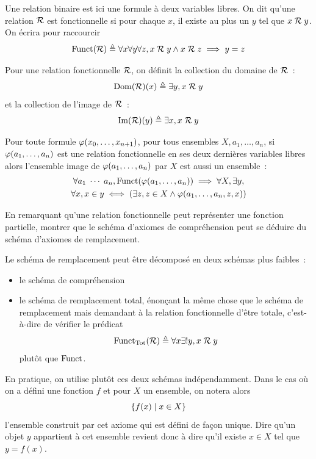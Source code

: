 \begin{definition}
  Une relation binaire est ici une formule à deux variables libres. On dit
  qu'une relation $\mathrel{\mathcal{R}}$ est fonctionnelle si pour chaque $x$, il existe
  au plus un $y$ tel que $x \mathrel{\mathcal{R}} y$. On écrira pour raccourcir
  \[\operatorname{Funct}(\mathrel{\mathcal{R}}) \triangleq \forall x\forall y\forall z,
  x \mathrel{\mathcal{R}} y\land x \mathrel{\mathcal{R}} z \implies y = z\]

  Pour une relation fonctionnelle $\mathrel{\mathcal{R}}$, on définit la collection du
  domaine de $\mathrel{\mathcal{R}}$~:
  \[\operatorname{Dom}(\mathrel{\mathcal{R}})(x)\triangleq \exists y, x \mathrel{\mathcal{R}} y\]
  et la collection de l'image de $\mathrel{\mathcal{R}}$~:
  \[\operatorname{Im}(\mathrel{\mathcal{R}})(y)\triangleq \exists x, x \mathrel{\mathcal{R}} y\]
\end{definition}

\begin{axiom}\label{ax.ZF.repl}
  Pour toute formule $\varphi(x_0,\ldots,x_{n+1})$, pour tous ensembles
  $X,a_1,\ldots,a_n$, si $\varphi(a_1,\ldots,a_n)$ est une relation fonctionnelle
  en ses deux dernières variables libres alors l'ensemble image de
  $\varphi(a_1,\ldots,a_n)$ par $X$ est aussi un ensemble~:
  \begin{multline*}
    \forall a_1\;\cdots\;a_n, \operatorname{Funct}(\varphi(a_1,\ldots,a_n))\implies \forall X,
    \exists y,\\
    \forall x, x \in y \iff (\exists z, z\in X \land \varphi(a_1,\ldots,a_n,z,x))
  \end{multline*}
\end{axiom}

\begin{exercise}
  En remarquant qu'une relation fonctionnelle peut représenter une fonction
  partielle, montrer que le schéma d'axiomes de compréhension peut se déduire du
  schéma d'axiomes de remplacement.
\end{exercise}

\begin{remark}
  Le schéma de remplacement peut être décomposé en deux schémas plus faibles~:
  \begin{itemize}
  \item le schéma de compréhension
  \item le schéma de remplacement total, énonçant la même chose que le schéma
    de remplacement mais demandant à la relation fonctionnelle d'être totale,
    c'est-à-dire de vérifier le prédicat
    \[\operatorname{Funct}_{\operatorname{Tot}}(\mathrel{\mathcal{R}}) \triangleq \forall x \exists! y, x \mathrel{\mathcal{R}} y\]
    plutôt que $\operatorname{Funct}$.
  \end{itemize}

  \noindent
  En pratique, on utilise plutôt ces deux schémas indépendamment. Dans le cas
  où on a défini une fonction $f$ et pour $X$ un ensemble, on notera alors
  \[\left\{ f(x) \;\middle\vert\; x \in X \right\}\]
  l'ensemble construit par cet axiome qui est défini de façon unique. Dire
  qu'un objet $y$ appartient à cet ensemble revient donc à dire qu'il existe
  $x \in X$ tel que $y = f(x)$.
\end{remark}

